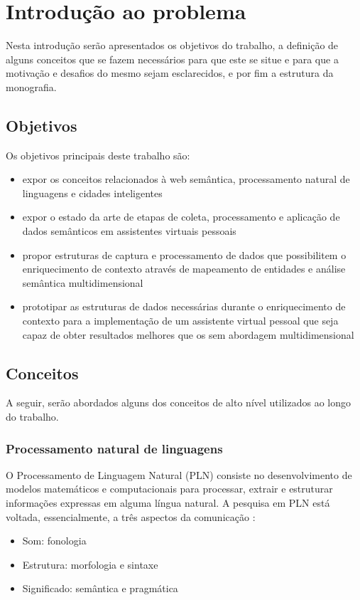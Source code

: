 \chapter{Introdução ao problema} \label{c:introducao_ao_problema}

Nesta introdução serão apresentados os objetivos do trabalho, a definição de alguns conceitos que se fazem necessários para que este se situe e para que a motivação e desafios do mesmo sejam esclarecidos, e por fim a estrutura da monografia.

\section{Objetivos} \label{s:objetivos}

Os objetivos principais deste trabalho são:

\begin{itemize}
    \item expor os conceitos relacionados à web semântica, processamento natural de linguagens e cidades inteligentes
    \item expor o estado da arte de etapas de coleta, processamento e aplicação de dados semânticos em assistentes virtuais pessoais
    \item propor estruturas de captura e processamento de dados que possibilitem o enriquecimento de contexto através de mapeamento de entidades e análise semântica multidimensional
    \item prototipar as estruturas de dados necessárias durante o enriquecimento de contexto para a implementação de um assistente virtual pessoal que seja capaz de obter resultados melhores que os sem abordagem multidimensional
\end{itemize}

\section{Conceitos} \label{s:conceitos}

A seguir, serão abordados alguns dos conceitos de alto nível utilizados ao longo do trabalho.

\subsection{Processamento natural de linguagens} \label{ss:processamento_natural_de_linguagens}

O Processamento de Linguagem Natural (PLN) consiste no desenvolvimento de modelos matemáticos e computacionais para processar, extrair e estruturar informações expressas em alguma língua natural. A pesquisa em PLN está voltada, essencialmente, a três aspectos da comunicação \cite{doprocessamento}:
\begin{itemize}
\item  Som: fonologia
\item  Estrutura: morfologia e sintaxe
\item  Significado: semântica e pragmática
\end{itemize}

